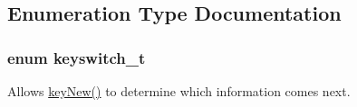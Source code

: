 \subsection{Enumeration Type Documentation}
\hypertarget{group__key_ga91fb3178848bd682000958089abbaf40}{
\subsubsection[{keyswitch\-\_\-t}]{\setlength{\rightskip}{0pt plus 5cm}enum {\bf keyswitch\-\_\-t}}}\label{group__key_ga91fb3178848bd682000958089abbaf40}


Allows \hyperlink{group__key_gad23c65b44bf48d773759e1f9a4d43b89}{key\-New()} to determine which information comes next. 

